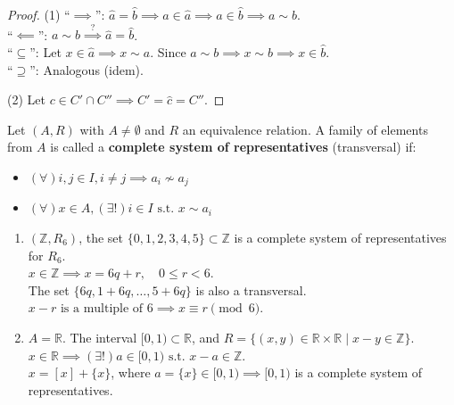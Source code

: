 \begin{proof}
(1)
``$\implies$'': $\hat{a} = \hat{b} \implies a \in \hat{a} \implies a \in \hat{b} \implies a \sim b$. \\
``$\impliedby$'': $a \sim b \overset{?}{\implies} \hat{a} = \hat{b}$. \\
``$\subseteq$'': Let $x \in \hat{a} \implies x \sim a$. Since $a \sim b \implies x \sim b \implies x \in \hat{b}$. \\
``$\supseteq$'': Analogous (idem).

(2) Let $c \in C' \cap C'' \implies C' = \hat{c} = C''$.
\end{proof}

\begin{definition}
Let $(A, R)$ with $A \neq \emptyset$ and $R$ an equivalence relation. A family of elements from $A$ is called a \textbf{complete system of representatives} (transversal) if:
\begin{itemize}
    \item[$(\alpha)$] $(\forall) i, j \in I, i \neq j \implies a_i \not\sim a_j$
    \item[$(\beta)$] $(\forall) x \in A, (\exists!) i \in I \text{ s.t. } x \sim a_i$
\end{itemize}
\end{definition}

\begin{example}\leavevmode
\begin{enumerate}
    \item $(\mathbb{Z}, R_6)$, the set $\{0, 1, 2, 3, 4, 5\} \subset \mathbb{Z}$ is a complete system of representatives for $R_6$. \\
    $x \in \mathbb{Z} \implies x = 6q + r, \quad 0 \leq r < 6$. \\
    The set $\{6q, 1+6q, \dots, 5+6q\}$ is also a transversal. \\
    $x - r \text{ is a multiple of } 6 \implies x \equiv r \pmod 6$.
    \item $A = \mathbb{R}$. The interval $[0, 1) \subset \mathbb{R}$, and $R = \{(x, y) \in \mathbb{R} \times \mathbb{R} \mid x - y \in \mathbb{Z}\}$. \\
    $x \in \mathbb{R} \implies (\exists!) a \in [0, 1) \text{ s.t. } x - a \in \mathbb{Z}$. \\
    $x = [x] + \{x\}$, where $a = \{x\} \in [0, 1) \implies [0, 1)$ is a complete system of representatives.
\end{enumerate}
\end{example}


